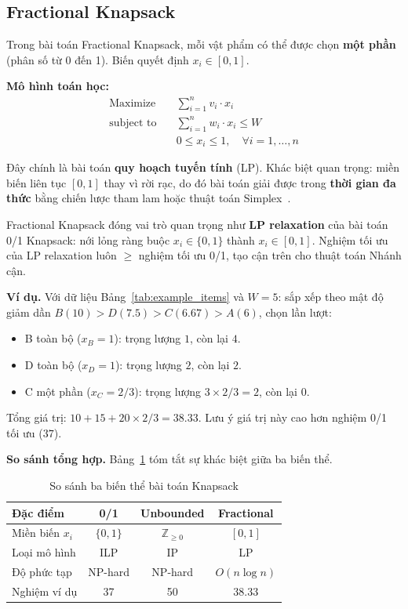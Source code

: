 \documentclass[fontsize=13pt,a4paper]{report}
\begin{document}
\subsection{Fractional Knapsack}

Trong bài toán Fractional Knapsack, mỗi vật phẩm có thể được chọn \textbf{một phần} (phân số từ 0 đến 1). Biến quyết định $x_i \in [0, 1]$.

\textbf{Mô hình toán học:}
\begin{align}
    \text{Maximize} \quad & \sum_{i=1}^{n} v_i \cdot x_i \label{eq:frobj} \\
    \text{subject to} \quad & \sum_{i=1}^{n} w_i \cdot x_i \leq W \label{eq:frcap} \\
    & 0 \leq x_i \leq 1, \quad \forall i = 1, \ldots, n \label{eq:frfrac}
\end{align}

Đây chính là bài toán \textbf{quy hoạch tuyến tính} (LP). Khác biệt quan trọng: miền biến liên tục $[0,1]$ thay vì rời rạc, do đó bài toán giải được trong \textbf{thời gian đa thức} bằng chiến lược tham lam hoặc thuật toán Simplex~\cite{dantzig1957discrete}.

Fractional Knapsack đóng vai trò quan trọng như \textbf{LP relaxation} của bài toán 0/1 Knapsack: nới lỏng ràng buộc $x_i \in \{0,1\}$ thành $x_i \in [0,1]$. Nghiệm tối ưu của LP relaxation luôn $\geq$ nghiệm tối ưu 0/1, tạo cận trên cho thuật toán Nhánh cận.

\textbf{Ví dụ.} Với dữ liệu Bảng~\ref{tab:example_items} và $W=5$: sắp xếp theo mật độ giảm dần $B(10) > D(7.5) > C(6.67) > A(6)$, chọn lần lượt:
\begin{itemize}[noitemsep]
    \item B toàn bộ ($x_B=1$): trọng lượng $1$, còn lại $4$.
    \item D toàn bộ ($x_D=1$): trọng lượng $2$, còn lại $2$.
    \item C một phần ($x_C=2/3$): trọng lượng $3 \times 2/3 = 2$, còn lại $0$.
\end{itemize}
Tổng giá trị: $10 + 15 + 20 \times 2/3 = 38.33$. Lưu ý giá trị này cao hơn nghiệm 0/1 tối ưu ($37$).


\textbf{So sánh tổng hợp.} Bảng~\ref{tab:compare_variants} tóm tắt sự khác biệt giữa ba biến thể.

\begin{table}[H]
\centering
\begin{tabular}{l|ccc}
\toprule
\textbf{Đặc điểm} & \textbf{0/1} & \textbf{Unbounded} & \textbf{Fractional} \\
\midrule
Miền biến $x_i$ & $\{0, 1\}$ & $\mathbb{Z}_{\geq 0}$ & $[0, 1]$ \\
Loại mô hình & ILP & IP & LP \\
Độ phức tạp & NP-hard & NP-hard & $O(n \log n)$ \\
Nghiệm ví dụ & 37 & 50 & 38.33 \\
\bottomrule
\end{tabular}
\caption{So sánh ba biến thể bài toán Knapsack}
\label{tab:compare_variants}
\end{table}
\end{document}
